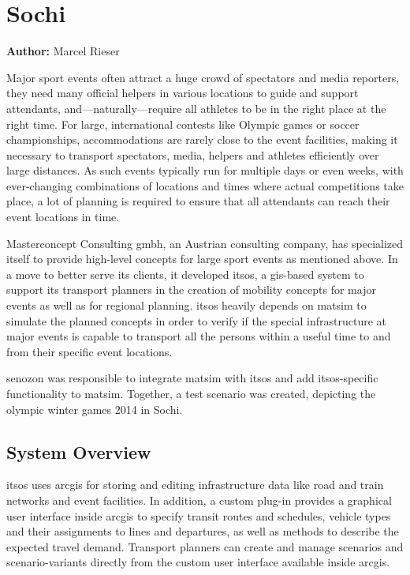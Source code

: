 \section{Sochi}
\label{sec:sochi}
\hfill \textbf{Author:} Marcel Rieser

Major sport events often attract a huge crowd of spectators and media
reporters, they need many official helpers in various locations to guide and
support attendants, and---naturally---require all athletes to be in
the right place at the right time. For large, international contests like
Olympic games or soccer championships, accommodations are rarely close to the
event facilities, making it necessary to transport spectators, media, helpers
and athletes efficiently over large distances. As such events typically run for
multiple days or even weeks, with ever-changing combinations of locations and
times where actual competitions take place, a lot of planning is required to
ensure that all attendants can reach their event locations in time.

Masterconcept Consulting \gls{gmbh}, an Austrian consulting company, has specialized
itself to provide high-level concepts for large sport events as mentioned above.  In a
move to better serve its clients, it developed \gls{itsos}, a \gls{gis}-based system to support its transport
planners in the creation of mobility concepts for major events as well as for
regional planning.  \gls{itsos} heavily depends on \gls{matsim} to simulate the planned
concepts in order to verify if the special infrastructure at major events is
capable to transport all the persons within a useful time to and from
their specific event locations.

\gls{senozon} was responsible to integrate \gls{matsim} with \gls{itsos} and add \gls{itsos}-specific
functionality to \gls{matsim}. Together, a test scenario was created, depicting the
olympic winter games 2014 in Sochi.

\subsection{System Overview}
\gls{itsos} uses \gls{arcgis} for storing and editing infrastructure data like road
and train networks and event facilities. In addition, a custom plug-in provides a
graphical user interface inside \gls{arcgis} to specify transit routes and schedules,
vehicle types and their assignments to lines and departures, as well as methods
to describe the expected travel demand. Transport planners can create and manage
scenarios and scenario-variants directly from the custom user interface
available inside \gls{arcgis}.


